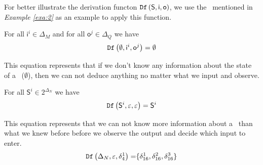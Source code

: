  
\begin{example}
 For better illustrate the derivation functon ${\tt Df}\left( \mathsf{S},  \mathsf{i},  \mathsf{o}\right)$, we use the \BCN\ mentioned in {\em Example \ref{exa:2}} as an example to apply this function. %
 
 For all $\mathsf{i}^{i}\in \Delta_M$ and for all $\mathsf{o}^{j}\in \Delta_Q$ we have 
\begin{equation*}
\begin{split}
{\tt Df}\left(\emptyset,\mathsf{i}^{i},\mathsf{o}^{j}\right)=\emptyset\\
\end{split}
\label{equ:7}
\end{equation*}

This equation represents that 
if we don't know any information about the state of a \BCN\ ($\emptyset$), then we can not deduce anything no matter what we input and observe.

For all $\mathsf{S}^{i}\in 2^{\Delta_N}$ we have 
\begin{equation*}
\begin{split}
{\tt Df}\left(\mathsf{S}^{i},\varepsilon,\varepsilon\right)=\mathsf{S}^{i}\\
\end{split}
\label{equ:8}
\end{equation*}

 This equation represents that %
 we can not know more information about a \BCN\ than what we knew before before we observe the output and decide which input to enter.
\begin{equation*}
\begin{split}
{\tt Df}\left(\Delta_N,\varepsilon,\delta_4^1\right)=&\{\delta_{16}^1,\delta_{16}^2,\delta_{16}^3\}\\
\end{split}
\label{equ:9}
\end{equation*}
 

\end{example}
